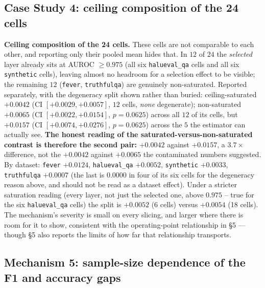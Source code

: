 \documentclass[10pt]{article} %
\begin{document}
\subsection{Case Study 4: ceiling composition of the 24 cells}

\textbf{Ceiling composition of the 24 cells.} These cells are not comparable
to each other, and reporting only their pooled mean hides that. In $12$ of $24$
the \emph{selected} layer already sits at AUROC $\geq0.975$ (all six
\texttt{halueval\_qa} cells and all six \texttt{synthetic} cells), leaving
almost no headroom for a selection effect to be visible; the remaining $12$
(\texttt{fever}, \texttt{truthfulqa}) are genuinely non-saturated. Reported
separately, with the degeneracy split shown rather than buried:
ceiling-saturated $+0.0042$ (CI $[+0.0029,+0.0057]$, $12$ cells, \emph{none}
degenerate); non-saturated $+0.0065$ (CI $[+0.0022,+0.0154]$, $p=0.0625$)
across all $12$ of its cells, but $+0.0157$ (CI $[+0.0074,+0.0276]$,
$p=0.0625$) across the $5$ the estimator can actually see. \textbf{The honest
reading of the saturated-versus-non-saturated contrast is therefore the second
pair:} $+0.0042$ against $+0.0157$, a $3.7\times$ difference, not the
$+0.0042$ against $+0.0065$ the contaminated numbers suggested. By dataset:
\texttt{fever} $+0.0124$, \texttt{halueval\_qa} $+0.0052$, \texttt{synthetic}
$+0.0033$, \texttt{truthfulqa} $+0.0007$ (the last is $0.0000$ in four of its
six cells for the degeneracy reason above, and should not be read as a dataset
effect). Under a stricter saturation reading (every layer, not just the
selected one, above $0.975$ -- true for the six \texttt{halueval\_qa} cells)
the split is $+0.0052$ (6 cells) versus $+0.0054$ (18 cells). The mechanism's
severity is small on every slicing, and larger where there is room for it to
show, consistent with the operating-point relationship in §5 --- though §5 also
reports the limits of how far that relationship transports.

\subsection{Mechanism 5: sample-size dependence of the F1 and accuracy gaps}
\end{document}
